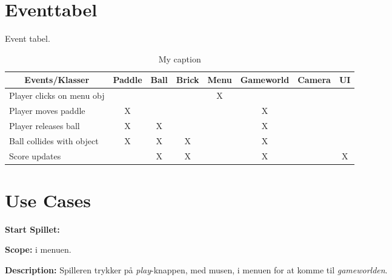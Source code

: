\section{Eventtabel}
Event tabel.
\begin{table}[]
\centering
\caption{My caption}
\label{my-label}
\begin{tabular}{l|ccccccc}
\multicolumn{1}{c}{Events/Klasser} & Paddle & Ball & Brick & Menu & Gameworld & Camera & UI \\ \hline
Player clicks on menu obj &                            &                          &                           & X                        &                               &                            &                        \\
Player moves paddle          & X                          &                          &                           &                          & X                             &                            &                        \\
Player releases ball         & X                          & X                        &                           &                          & X                             &                            &                        \\
Ball collides with object    & X                          & X                        & X                         &                          & X                             &                            &                        \\
Score updates                &                            & X                        & X                         &                          & X                             &                            & X                     
\end{tabular}
\end{table}

\section{Use Cases}

\textbf{Start Spillet:}\newline

\textbf{Scope:}\newline
i menuen.\newline

\textbf{Description:} \newline
Spilleren trykker på \textit{play}-knappen, med musen, i menuen for at komme til \textit{gameworlden}. \newline

